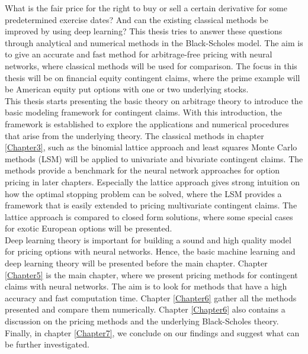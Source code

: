 What is the fair price for the right to buy or sell a certain derivative for some predetermined exercise dates? And can the existing classical methods be improved by using deep learning? This thesis tries to answer these questions through analytical and numerical methods in the Black-Scholes model. The aim is to give an accurate and fast method for arbitrage-free pricing with neural networks, where classical methods will be used for comparison. The focus in this thesis will be on financial equity contingent claims, where the prime example will be American equity put options with one or two underlying stocks.\\

This thesis starts presenting the basic theory on arbitrage theory to introduce the basic modeling framework for contingent claims. With this introduction, the framework is established to explore the applications and numerical procedures that arise from the underlying theory. The classical methods in chapter \ref{Chapter3}, such as the binomial lattice approach and least squares Monte Carlo methods (LSM) will be applied to univariate and bivariate contingent claims. The methods provide a benchmark for the neural network approaches for option pricing in later chapters. Especially the lattice approach gives strong intuition on how the optimal stopping problem can be solved, where the LSM provides a framework that is easily extended to pricing multivariate contingent claims. The lattice approach is compared to closed form solutions, where some special cases for exotic European options will be presented. \\

Deep learning theory is important for building a sound and high quality model for pricing options with neural networks. Hence, the basic machine learning and deep learning theory will be presented before the main chapter. Chapter \ref{Chapter5} is the main chapter, where we present pricing methods for contingent claims with neural networks. The aim is to look for methods that have a high accuracy and fast computation time. Chapter \ref{Chapter6} gather all the methods presented and compare them numerically. Chapter \ref{Chapter6} also contains a discussion on the pricing methods and the underlying Black-Scholes theory. Finally, in chapter \ref{Chapter7}, we conclude on our findings and suggest what can be further investigated.


